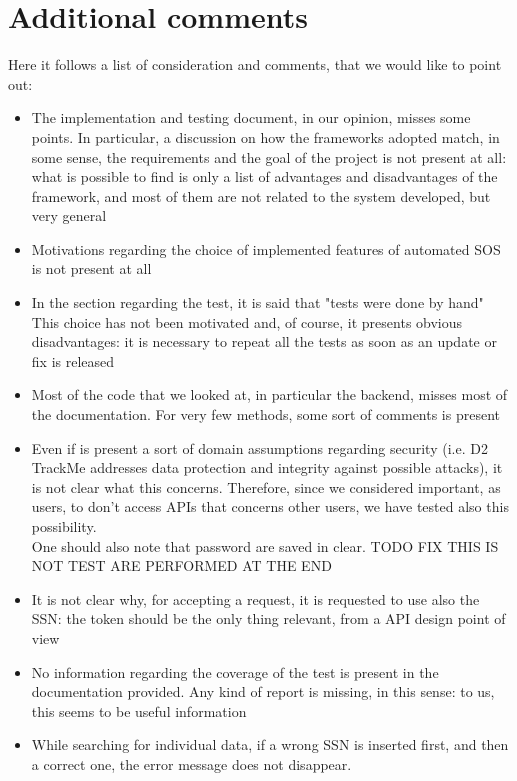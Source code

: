 \section{Additional comments}
Here it follows a list of consideration and comments, that we would like to point out:
\begin{itemize}
\item The implementation and testing document, in our opinion, misses some points. 
In particular, a discussion on how the frameworks adopted match, in some sense, the requirements and the goal of the project 
is not present at all: what is possible to find is only a list of advantages and disadvantages of the framework, and most of them are not
related to the system developed, but very general
\item Motivations regarding the choice of implemented features of automated SOS is not present at all
\item In the section regarding the test, it is said that "tests were done by hand"
This choice has not been motivated and, of course, it presents obvious disadvantages: it is necessary to repeat all the tests as soon as
an update or fix is released
\item Most of the code that we looked at, in particular the backend, misses most of the documentation. For very few methods, some sort
of comments is present
\item Even if is present a sort of domain assumptions regarding security (i.e. D2 TrackMe addresses data protection and integrity against
possible attacks), it is not clear what this concerns. Therefore, since we considered important, as users, to don't access APIs that
concerns other users, we have tested also this possibility. \\
One should also note that password are saved in clear.
TODO FIX THIS IS NOT TEST ARE PERFORMED AT THE END 
\item It is not clear why, for accepting a request, it is requested to use also the SSN: the token should be the only thing relevant, from a
API design point of view
\item No information regarding the coverage of the test is present in the documentation provided. 
Any kind of report is missing, in this sense: to us, this seems to be useful information
\item While searching for individual data, if a wrong SSN is inserted first, and then 
a correct one, the error message does not disappear. 


\end{itemize}
